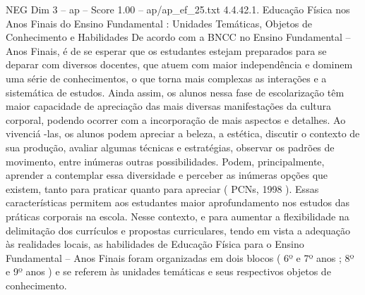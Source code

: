 \begin{textsample}{NEG Dim 3 – ap – Score 1.00 – ap/ap\_ef\_25.txt}  \label{ex:f3_neg_105}
4.4.42.1.
Educação Física nos Anos Finais do Ensino Fundamental : Unidades Temáticas, Objetos de Conhecimento e Habilidades De acordo com a BNCC no Ensino Fundamental – Anos Finais, é de se esperar que os estudantes estejam preparados para se deparar com diversos docentes, que atuem com maior independência e dominem uma série de conhecimentos, o que torna mais complexas as interações e a sistemática de estudos.
Ainda assim, os alunos nessa fase de escolarização têm maior capacidade de apreciação das mais diversas manifestações da cultura corporal, podendo ocorrer com a incorporação de mais aspectos e detalhes.
Ao vivenciá -las, os alunos podem apreciar a beleza, a estética, discutir o contexto de sua produção, avaliar algumas técnicas e estratégias, observar os padrões de movimento, entre inúmeras outras possibilidades.
Podem, principalmente, aprender a contemplar essa diversidade e perceber as inúmeras opções que existem, tanto para praticar quanto para apreciar ( PCNs, 1998 ).
Essas características permitem aos estudantes maior aprofundamento nos estudos das práticas corporais na escola.
Nesse contexto, e para aumentar a flexibilidade na delimitação dos currículos e propostas curriculares, tendo em vista a adequação às realidades locais, as habilidades de Educação Física para o Ensino Fundamental – Anos Finais foram organizadas em dois blocos ( 6º e 7º anos ; 8º e 9º anos ) e se referem às unidades temáticas e seus respectivos objetos de conhecimento.

\end{textsample}
